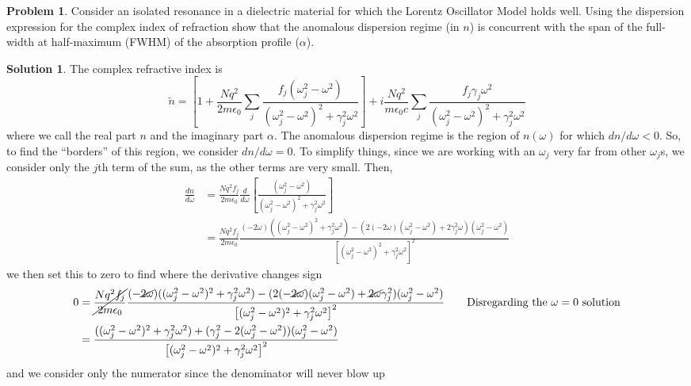 \documentclass[10pt]{article}
\theoremstyle{definition}
\newtheorem{problem}{Problem}
\newtheorem{soln}{Solution}
\newcommand{\ti}[1]{\widetilde{#1}}
\newcommand{\justif}[2]{&{#1}&\text{#2}}
\begin{document}
\begin{problem}
Consider an isolated resonance in a dielectric material for which the Lorentz
Oscillator Model holds well. Using the dispersion expression for the complex
index of refraction show that the anomalous dispersion regime (in $n$) is concurrent
with the span of the full-width at half-maximum (FWHM) of the absorption
profile ($\alpha$).
\end{problem}
\begin{soln}
  The complex refractive index is
  $$\ti{n}=\left[1+\frac{Nq^2}{2m\epsilon_0}\sum_j\frac{f_j(\omega_j^2-\omega^2)}{(\omega_j^2-\omega^2)^2+\gamma_j^2\omega^2}\right]
    +i\frac{Nq^2}{m\epsilon_0c}\sum_j\frac{f_j\gamma_j\omega^2}{(\omega_j^2-\omega^2)^2+\gamma_j^2\omega^2}
  $$
  where we call the real part $n$ and the imaginary part $\alpha$. The anomalous dispersion regime is the region of $n(\omega)$ for which $dn/d\omega<0$.
  So, to find the ``borders'' of this region, we consider $dn/d\omega=0$.
  To simplify things, since we are working with an $\omega_j$ very far from other $\omega_j$s, we consider only the $j$th term of the sum, as the other
  terms are very small. Then,
  \begin{align*}
    \frac{dn}{d\omega} & =\frac{Nq^2f_j}{2m\epsilon_0}\frac{d}{d\omega}\left[\frac{(\omega_j^2-\omega^2)}{(\omega_j^2-\omega^2)^2+\gamma_j^2\omega^2}\right] \\
                       & =\frac{Nq^2f_j}{2m\epsilon_0}\frac{(-2\omega)((\omega_j^2-\omega^2)^2+\gamma_j^2\omega^2)
      -(2(-2\omega)(\omega_j^2-\omega^2)+2\gamma_j^2\omega)(\omega_j^2-\omega^2)
    }{\left[(\omega_j^2-\omega^2)^2+\gamma_j^2\omega^2\right]^2}
  \end{align*}
  we then set this to zero to find where the derivative changes sign
  \begin{align*}
    0 & =\cancel{\frac{Nq^2f_j}{2m\epsilon_0}}\frac{(-\cancel{2\omega})((\omega_j^2-\omega^2)^2+\gamma_j^2\omega^2)
      -(2(-\cancel{2\omega})(\omega_j^2-\omega^2)+\cancel{2\omega}\gamma_j^2)(\omega_j^2-\omega^2)
    }{\left[(\omega_j^2-\omega^2)^2+\gamma_j^2\omega^2\right]^2}\justif{\quad}{Disregarding the $\omega=0$ solution} \\
      & =\frac{((\omega_j^2-\omega^2)^2+\gamma_j^2\omega^2)
      +(\gamma_j^2-2(\omega_j^2-\omega^2))(\omega_j^2-\omega^2)
    }{\left[(\omega_j^2-\omega^2)^2+\gamma_j^2\omega^2\right]^2}
  \end{align*}
  and we consider only the numerator since the denominator will never blow up
  \begin{align*}

\end{align*}
\end{soln}
\end{document}
